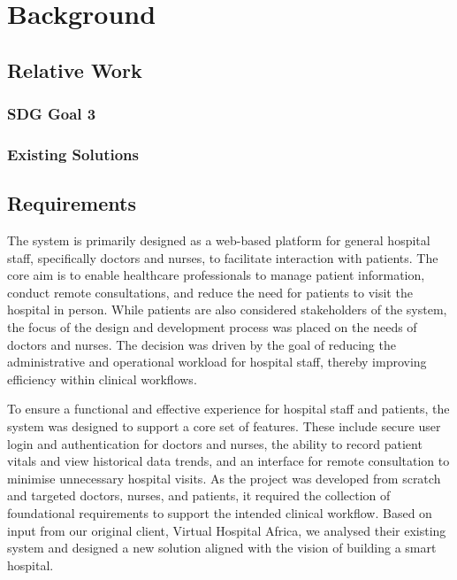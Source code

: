 %
%
\chapter{Background}
\label{chap:background}


\section{Relative Work}
\label{sec:relative-work}

\subsection{SDG Goal 3}
\label{sec:sdg-goal-3}


\subsection{Existing Solutions}
\label{sec:existing-solutions}



\clearpage
\section{Requirements}
\label{sec:requirements}

The system is primarily designed as a web-based platform for general hospital staff, specifically doctors and nurses, to facilitate interaction with patients. The core aim is to enable healthcare professionals to manage patient information, conduct remote consultations, and reduce the need for patients to visit the hospital in person.
While patients are also considered stakeholders of the system, the focus of the design and development process was placed on the needs of doctors and nurses. The decision was driven by the goal of reducing the administrative and operational workload for hospital staff, thereby improving efficiency within clinical workflows.

To ensure a functional and effective experience for hospital staff and patients, the system was designed to support a core set of features. These include secure user login and authentication for doctors and nurses, the ability to record patient vitals and view historical data trends, and an interface for remote consultation to minimise unnecessary hospital visits.
As the project was developed from scratch and targeted doctors, nurses, and patients, it required the collection of foundational requirements to support the intended clinical workflow. Based on input from our original client, Virtual Hospital Africa, we analysed their existing system and designed a new solution aligned with the vision of building a smart hospital.

